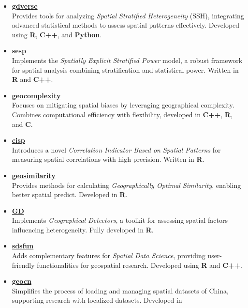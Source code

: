 \documentclass[11pt,a4paper,]{moderncv}
\begin{document}
\begin{itemize}
\item
  \textbf{\href{https://github.com/stscl/gdverse}{gdverse}}\\
  Provides tools for analyzing \emph{Spatial Stratified Heterogeneity}
  (SSH), integrating advanced statistical methods to assess spatial
  patterns effectively. Developed using \textbf{R}, \textbf{C++}, and
  \textbf{Python}.
\item
  \textbf{\href{https://github.com/stscl/sesp}{sesp}}\\
  Implements the \emph{Spatially Explicit Stratified Power} model, a
  robust framework for spatial analysis combining stratification and
  statistical power. Written in \textbf{R} and \textbf{C++}.
\item
  \textbf{\href{https://github.com/ausgis/geocomplexity}{geocomplexity}}\\
  Focuses on mitigating spatial biases by leveraging geographical
  complexity. Combines computational efficiency with flexibility,
  developed in \textbf{C++}, \textbf{R}, and \textbf{C}.
\item
  \textbf{\href{https://github.com/stscl/cisp}{cisp}}\\
  Introduces a novel \emph{Correlation Indicator Based on Spatial
  Patterns} for measuring spatial correlations with high precision.
  Written in \textbf{R}.
\item
  \textbf{\href{https://github.com/ausgis/geosimilarity}{geosimilarity}}\\
  Provides methods for calculating \emph{Geographically Optimal
  Similarity}, enabling better spatial predict. Developed in \textbf{R}.
\item
  \textbf{\href{https://github.com/ausgis/GD}{GD}}\\
  Implements \emph{Geographical Detectors}, a toolkit for assessing
  spatial factors influencing heterogeneity. Fully developed in
  \textbf{R}.
\item
  \textbf{\href{https://github.com/stscl/sdsfun}{sdsfun}}\\
  Adds complementary features for \emph{Spatial Data Science}, providing
  user-friendly functionalities for geospatial research. Developed using
  \textbf{R} and \textbf{C++}.
\item
  \textbf{\href{https://github.com/stscl/geocn}{geocn}}\\
  Simplifies the process of loading and managing spatial datasets of
  China, supporting research with localized datasets. Developed in

\end{itemize}
\end{document}
